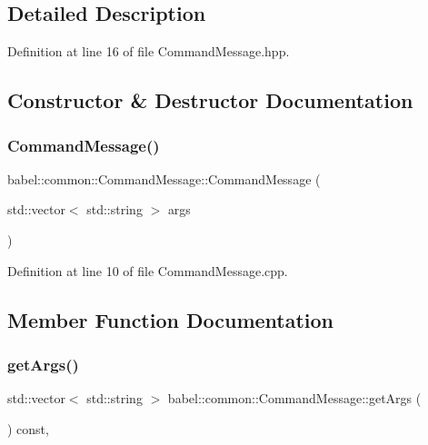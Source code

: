 \subsection{Detailed Description}


Definition at line 16 of file Command\+Message.\+hpp.



\subsection{Constructor \& Destructor Documentation}
\mbox{\label{classbabel_1_1common_1_1_command_message_a3b8229f6b6b8bf9dbfed3278f888ffda}} 
\subsubsection{\texorpdfstring{Command\+Message()}{CommandMessage()}}
{\footnotesize\ttfamily babel\+::common\+::\+Command\+Message\+::\+Command\+Message (\begin{DoxyParamCaption}\item[{std\+::vector$<$ std\+::string $>$}]{args }\end{DoxyParamCaption})}



Definition at line 10 of file Command\+Message.\+cpp.



\subsection{Member Function Documentation}
\mbox{\label{classbabel_1_1common_1_1_command_message_a930b0c028e19e070a7c7b54d4322d64e}} 
\subsubsection{\texorpdfstring{get\+Args()}{getArgs()}}
{\footnotesize\ttfamily std\+::vector$<$ std\+::string $>$ babel\+::common\+::\+Command\+Message\+::get\+Args (\begin{DoxyParamCaption}{ }\end{DoxyParamCaption}) const\hspace{0.3cm}{\ttfamily [override]}, {\ttfamily [virtual]}}




